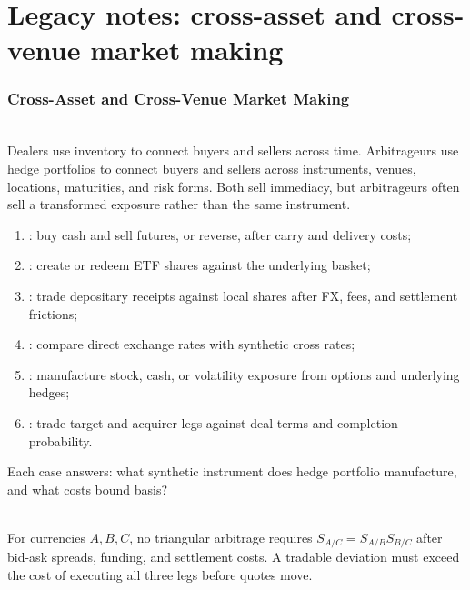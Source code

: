 \documentclass[a4paper,oneside,openany]{book}
\begin{document}
\chapter*{Legacy notes: cross-asset and cross-venue market making}

\subsection*{Cross-Asset and Cross-Venue Market Making}

\begin{principle} \\
Dealers use inventory to connect buyers and sellers across time. Arbitrageurs use hedge portfolios to connect buyers and sellers across instruments, venues, locations, maturities, and risk forms. Both sell immediacy, but arbitrageurs often sell a transformed exposure rather than the same instrument.
\end{principle}

\begin{taxonomy} 
\begin{enumerate}[label=\roman*.]
\setlength{\itemsep}{0pt}
\item {}: buy cash and sell futures, or reverse, after carry and delivery costs;
\item {}: create or redeem ETF shares against the underlying basket;
\item {}: trade depositary receipts against local shares after FX, fees, and settlement frictions;
\item {}: compare direct exchange rates with synthetic cross rates;
\item {}: manufacture stock, cash, or volatility exposure from options and underlying hedges;
\item {}: trade target and acquirer legs against deal terms and completion probability.
\end{enumerate}
Each case answers: what synthetic instrument does hedge portfolio manufacture, and what costs bound basis?
\end{taxonomy}

\begin{model} \\
For currencies $A,B,C$, no triangular arbitrage requires $S_{A/C}=S_{A/B}S_{B/C}$ after bid-ask spreads, funding, and settlement costs. A tradable deviation must exceed the cost of executing all three legs before quotes move.
\end{model}
\end{document}
